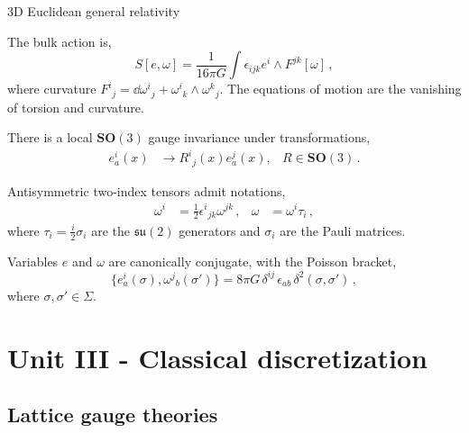 \documentclass{beamer}
\begin{document}
\begin{frame}{3D Euclidean general relativity}
    \begin{list}{\maltese}{\leftmargin=1em \itemindent=0em}
        \item<1-> The bulk action is,
        \begin{equation}
            S[e,\omega]=\frac{1}{16\pi G}\int \epsilon_{ijk}e^i \wedge F^{jk}[\omega]\,,
        \end{equation}
        where curvature ${F^i}_j=\dd{{\omega^i}_j}+{\omega^i}_k \wedge {\omega^k}_j$. The equations of motion are the vanishing of torsion and curvature.
        \item<2-> There is a local $\mathbf{SO}(3)$ gauge invariance under transformations,
        \begin{align}
            e^i_a(x)&\to {R^i}_j(x)e^j_a(x), &R\in\mathbf{SO}(3)\,.
        \end{align}
        \item<3-> Antisymmetric two-index tensors admit notations,
        \begin{align}
            \omega^i&=\frac{1}{2}{\epsilon^i}_{jk}\omega^{jk}\,, &\omega&=\omega^i\tau_i\,, 
        \end{align}
        where $\tau_i=\frac{i}{2}\sigma_i$ are the $\mathfrak{su}(2)$ generators and $\sigma_i$ are the Pauli matrices.
        \item<4-> Variables $e$ and $\omega$ are canonically conjugate, with the Poisson bracket,
        \begin{equation}
            \{e^i_a(\sigma),{\omega^j}_b(\sigma')\}=8\pi G\,\delta^{ij}\,\epsilon_{ab}\, \delta^2(\sigma,\sigma')\,,
        \end{equation}
        where $\sigma,\sigma'\in\Sigma$.
    \end{list}
\end{frame}

\section{Unit III - Classical discretization}

\subsection{Lattice gauge theories}
\end{document}
